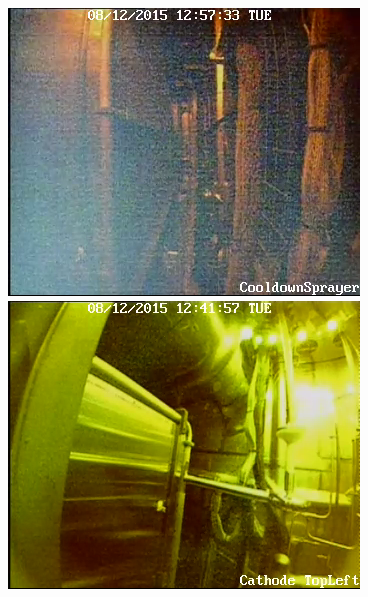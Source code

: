 \begin{figure}
   \includegraphics[width=\linewidth]{cooldownsp}
 \endminipage
   \includegraphics[width=\linewidth]{cathodetl}
 \endminipage


\end{figure}
